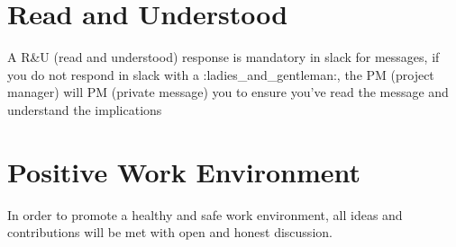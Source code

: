 \documentclass{scrreprt}
\begin{document}
\section{Read and Understood}
A R&U (read and understood) response is mandatory in slack for messages, if you do not respond in slack with a :ladies\_and\_gentleman:, the PM (project manager) will PM (private message) you to ensure you've read the message and understand the implications

\section{Positive Work Environment}

In order to promote a healthy and safe work environment, all ideas and 
contributions will be met with open and honest discussion.
\end{document}
